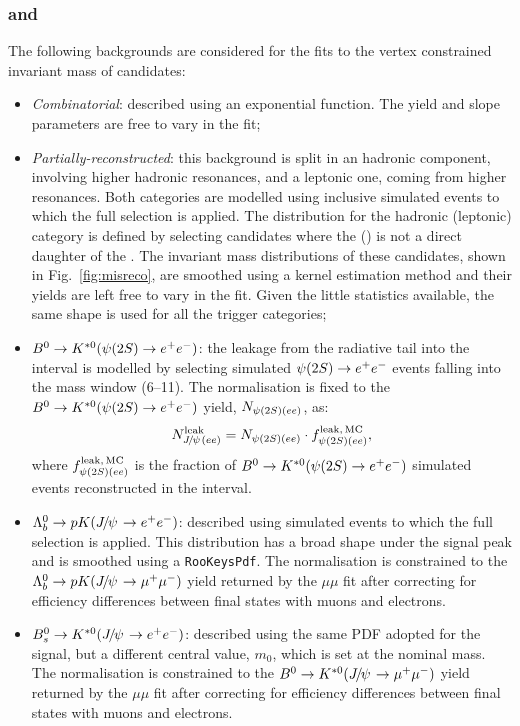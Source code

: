 \subsubsection*{\BdToKstJPsee and \BdToKstPsiee}

The following backgrounds are considered for the fits to the vertex constrained invariant mass 
of \BdToKstJPsee candidates:
%
\begin{itemize}

\item \textit{Combinatorial}: described using an exponential function. The yield and slope parameters are free to vary in the fit;

\item \textit{Partially-reconstructed}: this background is split in an hadronic component, involving higher hadronic resonances, and a leptonic one, coming from higher \ccbar resonances. Both categories are modelled using inclusive  simulated events to which the full selection is applied. The distribution for the hadronic (leptonic) category is defined by selecting candidates where the \Kstarz (\jpsi) is not a direct daughter of the \Bz. The invariant mass distributions of these candidates, shown in Fig.~\ref{fig:misreco}, are smoothed using a kernel estimation method and their yields are left free to vary in the fit. Given the little statistics available, the same shape is used for all the trigger categories;

\item $\Bz\to\Kstarz(\psitwos\to\ee)$: the leakage from the \psitwos radiative tail into the \jpsi interval is modelled by selecting simulated $\psitwos\to\ee$ events falling into the \jpsi mass window (6--11\gevgevcccc). The normalisation is fixed to the $\Bd\to\Kstarz(\psitwos\to\ee)$ yield, $N_{\psitwos(ee)}$, as:
%
$$N_{\jpsi(ee)}^{\rm leak} = N_{\psitwos(ee)} \cdot f_{\psitwos(ee)}^{\rm leak, \,MC},$$
%
where $f_{\psitwos(ee)}^{\rm leak, \,MC}$ is the fraction of $\Bd\to\Kstarz(\psitwos\to\ee)$ simulated events reconstructed in the \jpsi interval.

\item $\Lb\to pK(\jpsi\to\ee)$: described using simulated events to which the full selection is applied. This distribution has a broad shape under the signal peak and is smoothed using a \texttt{RooKeysPdf}. The normalisation is constrained to the $\Lb\to pK(\jpsi\to\mumu)$ yield returned by the $\mu\mu$ fit after correcting for efficiency differences between final states with muons and electrons.

\item $\Bs\to\Kstarz(\jpsi\to\ee)$: described using the same PDF adopted for the signal, but a different central value, $m_0$, which is set at the \Bs nominal mass. The normalisation is constrained to the $\Bd\to\Kstarz(\jpsi\to\mumu)$ yield returned by the $\mu\mu$ fit after correcting for efficiency differences between final states with muons and electrons.

\end{itemize}

